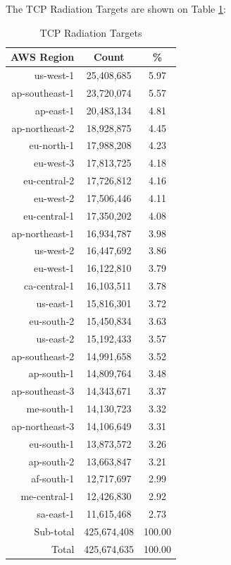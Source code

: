 \newpage
The TCP Radiation Targets are shown on Table \ref{tab:tcpradiationtargets}:
\begin{table}[!h]
\begin{center}
\caption{TCP Radiation Targets}
\label{tab:tcpradiationtargets}
\begin{tabular}{ |r|c|c| }
\hline
\centering AWS Region & Count & \%  \\
\hline
us-west-1 & 25,408,685 & 5.97  \\
ap-southeast-1 & 23,720,074 & 5.57  \\
ap-east-1 & 20,483,134 & 4.81  \\
ap-northeast-2 & 18,928,875 & 4.45  \\
eu-north-1 & 17,988,208 & 4.23  \\
eu-west-3 & 17,813,725 & 4.18  \\
eu-central-2 & 17,726,812 & 4.16  \\
eu-west-2 & 17,506,446 & 4.11  \\
eu-central-1 & 17,350,202 & 4.08  \\
ap-northeast-1 & 16,934,787 & 3.98  \\
us-west-2 & 16,447,692 & 3.86  \\
eu-west-1 & 16,122,810 & 3.79  \\
ca-central-1 & 16,103,511 & 3.78  \\
us-east-1 & 15,816,301 & 3.72  \\
eu-south-2 & 15,450,834 & 3.63  \\
us-east-2 & 15,192,433 & 3.57  \\
ap-southeast-2 & 14,991,658 & 3.52  \\
ap-south-1 & 14,809,764 & 3.48  \\
ap-southeast-3 & 14,343,671 & 3.37  \\
me-south-1 & 14,130,723 & 3.32  \\
ap-northeast-3 & 14,106,649 & 3.31  \\
eu-south-1 & 13,873,572 & 3.26  \\
ap-south-2 & 13,663,847 & 3.21  \\
af-south-1 & 12,717,697 & 2.99  \\
me-central-1 & 12,426,830 & 2.92  \\
sa-east-1 & 11,615,468 & 2.73  \\
\hline
Sub-total & 425,674,408 & 100.00  \\
\hline
Total & 425,674,635 & 100.00  \\
\hline
\end{tabular}
\end{center}
\end{table}

